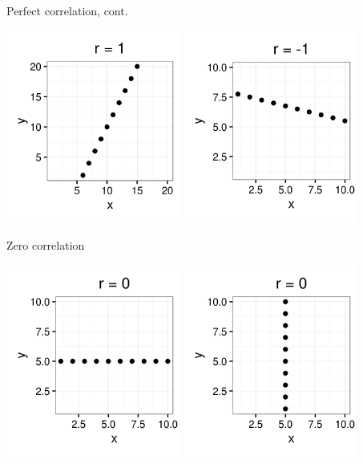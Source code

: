 \documentclass[xcolor=table, handout]{beamer}
\begin{document}
\begin{frame}{Perfect correlation, cont.}

{\centering
\includegraphics[width=2.25in]{../images/ch10_cor_pos2}
\includegraphics[width=2.25in]{../images/ch10_cor_neg2}
\par}
\end{frame}

\begin{frame}{Zero correlation}

{\centering
\includegraphics[width=2.25in]{../images/ch10_cor_zero}
\includegraphics[width=2.25in]{../images/ch10_cor_zerox}
\par}
\end{frame}
\end{document}
